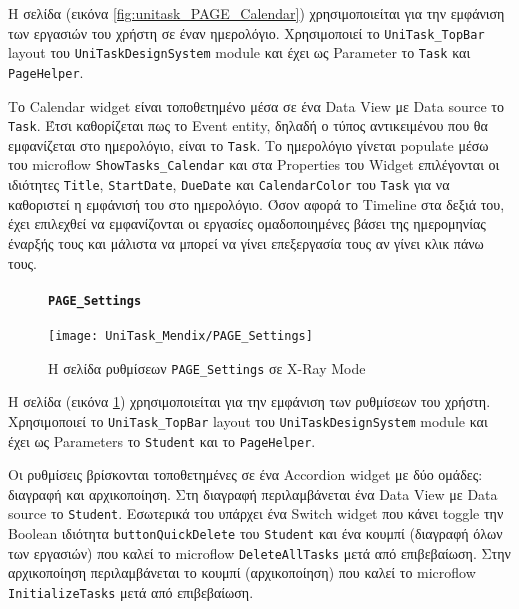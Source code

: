                 Η σελίδα (εικόνα \ref{fig:unitask_PAGE_Calendar}) χρησιμοποιείται για την εμφάνιση των εργασιών του χρήστη σε έναν ημερολόγιο. Χρησιμοποιεί το \texttt{UniTask\_TopBar} layout του \texttt{UniTaskDesignSystem} module και έχει ως Parameter το \texttt{Task} και \texttt{PageHelper}.

                Το Calendar widget είναι τοποθετημένο μέσα σε ένα Data View με Data source το \texttt{Task}. Έτσι καθορίζεται πως το Event entity, δηλαδή ο τύπος αντικειμένου που θα εμφανίζεται στο ημερολόγιο, είναι το \texttt{Task}. Το ημερολόγιο γίνεται populate μέσω του microflow \texttt{ShowTasks\_Calendar} και στα Properties του Widget επιλέγονται οι ιδιότητες \texttt{Title}, \texttt{StartDate}, \texttt{DueDate} και \texttt{CalendarColor} του \texttt{Task} για να καθοριστεί η εμφάνισή του στο ημερολόγιο. Όσον αφορά το Timeline στα δεξιά του, έχει επιλεχθεί να εμφανίζονται οι εργασίες ομαδοποιημένες βάσει της ημερομηνίας έναρξής τους και μάλιστα να μπορεί να γίνει επεξεργασία τους αν γίνει κλικ πάνω τους.

                \begin{figure}[H] \noindent
                    \paragraph{\texttt{PAGE\_Settings}}
                    \begin{center}
                        \texttt{[image: UniTask\_Mendix/PAGE\_Settings]}
                        \caption{\centering Η σελίδα ρυθμίσεων \texttt{PAGE\_Settings} σε X-Ray Mode}
                        \label{fig:unitask_PAGE_Settings}
                    \end{center}
                \end{figure}

                Η σελίδα (εικόνα \ref{fig:unitask_PAGE_Settings}) χρησιμοποιείται για την εμφάνιση των ρυθμίσεων του χρήστη. Χρησιμοποιεί το \texttt{UniTask\_TopBar} layout του \texttt{UniTaskDesignSystem} module και έχει ως Parameters το \texttt{Student} και το \texttt{PageHelper}.

                Οι ρυθμίσεις βρίσκονται τοποθετημένες σε ένα Accordion widget με δύο ομάδες: διαγραφή και αρχικοποίηση. Στη διαγραφή περιλαμβάνεται ένα Data View με Data source το \texttt{Student}. Εσωτερικά του υπάρχει ένα Switch widget που κάνει toggle την Boolean ιδιότητα \texttt{buttonQuickDelete} του \texttt{Student} και ένα κουμπί ({\Zona διαγραφή όλων των εργασιών}) που καλεί το microflow \texttt{DeleteAllTasks} μετά από επιβεβαίωση. Στην αρχικοποίηση περιλαμβάνεται το κουμπί ({\Zona αρχικοποίηση}) που καλεί το microflow \texttt{InitializeTasks} μετά από επιβεβαίωση.

